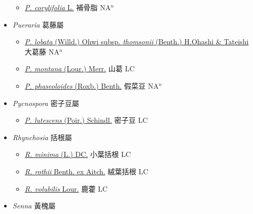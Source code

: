 \begin{itemize}
  \begin{itemize}
        \item[] \href{http://www.theplantlist.org/tpl1.1/search?q=Psoralea+corylifolia}{\textit{P. corylifolia} L.}   補骨脂 NA$^n$
  \end{itemize}
 \item[] \textit{Pueraria} 葛藤屬
                    
  \begin{itemize}
        \item[] \href{http://www.theplantlist.org/tpl1.1/search?q=Pueraria+lobata+subsp.+thomsonii}{\textit{P. lobata} (Willd.) Ohwi subsp. \textit{thomsonii} (Benth.) H.Ohashi \& Tateishi}   大葛藤 NA$^n$
        \item[] \href{http://www.theplantlist.org/tpl1.1/search?q=Pueraria+montana}{\textit{P. montana} (Lour.) Merr.}   山葛 LC
        \item[] \href{http://www.theplantlist.org/tpl1.1/search?q=Pueraria+phaseoloides}{\textit{P. phaseoloides} (Roxb.) Benth.}   假菜豆 NA$^n$
  \end{itemize}
 \item[] \textit{Pycnospora} 密子豆屬
                    
  \begin{itemize}
        \item[] \href{http://www.theplantlist.org/tpl1.1/search?q=Pycnospora+lutescens}{\textit{P. lutescens} (Poir.) Schindl.}   密子豆 LC
  \end{itemize}
 \item[] \textit{Rhynchosia} 括根屬
                    
  \begin{itemize}
        \item[] \href{http://www.theplantlist.org/tpl1.1/search?q=Rhynchosia+minima}{\textit{R. minima} (L.) DC.}     小葉括根 LC
        \item[] \href{http://www.theplantlist.org/tpl1.1/search?q=Rhynchosia+rothii}{\textit{R. rothii} Benth. ex Aitch.}   絨葉括根 LC
        \item[] \href{http://www.theplantlist.org/tpl1.1/search?q=Rhynchosia+volubilis}{\textit{R. volubilis} Lour.}   鹿藿 LC
  \end{itemize}
 \item[] \textit{Senna} 黃槐屬
                    

\end{itemize}
